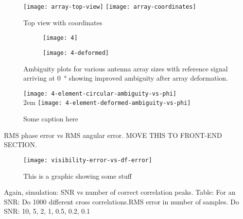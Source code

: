 \begin{figure}
  \texttt{[image: array-top-view]}
  \texttt{[image: array-coordinates]}
  \caption{Top view with coordinates}
  \label{fig:rf-front-end:array-coordinates}
\end{figure}

\begin{figure}
  \centering
  \begin{subfigure}{\textwidth}
    \centering
    \texttt{[image: 4]}
  \end{subfigure}
  \begin{subfigure}{\textwidth}
    \centering
    \texttt{[image: 4-deformed]}
  \end{subfigure}
  \caption{Ambiguity plots for various antenna array sizes with reference signal arriving at \SI{0}{\degree} showing improved ambiguity after array deformation.}
\end{figure}

\begin{figure}
  \centering
  \texttt{[image: 4-element-circular-ambiguity-vs-phi]}\\2em
  \texttt{[image: 4-element-deformed-ambiguity-vs-phi]}
  \caption{Some caption here}
\end{figure}

RMS phase error vs RMS angular error. MOVE THIS TO FRONT-END SECTION.
\begin{figure}
  \centering
  \texttt{[image: visibility-error-vs-df-error]}
  \caption{This is a graphic showing some stuff}
\end{figure}

Again, simulation:
SNR vs number of correct correlation peaks.
Table: 
For an SNR: Do 1000 different cross correlations.RMS error in number of samples.
Do SNR: 10, 5, 2, 1, 0.5, 0.2, 0.1
